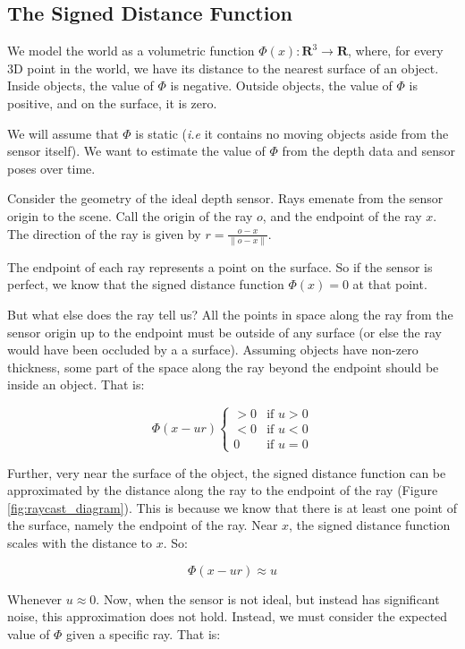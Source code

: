 \documentclass[conference,10pt]{IEEEtran}
\begin{document}
\subsection{The Signed Distance Function}
We model the world as a volumetric function $\Phi(x) : \mathbf{R}^3 \to
\mathbf{R}$, where, for every 3D point in the world, we have its distance to the
nearest surface of an object. Inside objects, the value of $\Phi$ is negative.
Outside objects, the value of $\Phi$ is positive, and on the surface, it is
zero.

 We will assume that $\Phi$ is static (\textit{i.e} it contains no moving
 objects aside from the sensor itself). We want to estimate the value of $\Phi$
 from the depth data and sensor poses over time.

Consider the geometry of the ideal depth sensor. Rays emenate from the sensor
origin to the scene. Call the origin of the ray $o$, and the endpoint of the ray
$x$. The direction of the ray is given by $r = \frac{o - x}{\|o - x\|}$.

The endpoint of each ray represents a point on the surface. So if the sensor is
perfect, we know that the signed distance function $\Phi(x) = 0$ at that point. 

But what else does the ray tell us? All the points in space along the ray from
the sensor origin up to the endpoint must be outside of any surface (or else the
ray would have been occluded by a a surface). Assuming objects have non-zero
thickness, some part of the space along the ray beyond the endpoint should be
inside an object. That is:

$$ \Phi(x - ur) 
     \begin{cases}
     > 0 & \text{if } u > 0 \\
     < 0 & \text{if } u < 0 \\
     0 & \text{if } u = 0
     \end{cases}
     $$

Further, very near the surface of the object, the signed distance function can
be approximated by the distance along the ray to the endpoint of  the ray
(Figure \ref{fig:raycast_diagram}). This is because we know that there is at
least one point of the surface, namely the endpoint of the ray.  Near $x$, the
signed distance function scales with the distance to $x$. So:

$$ \Phi(x - ur) \approx u $$

\noindent Whenever $u \approx 0$.  Now, when the sensor is not ideal, but
instead has significant noise, this approximation does not hold. Instead, we
must consider the expected value of $ \Phi $ given a specific ray. That is:
\end{document}
